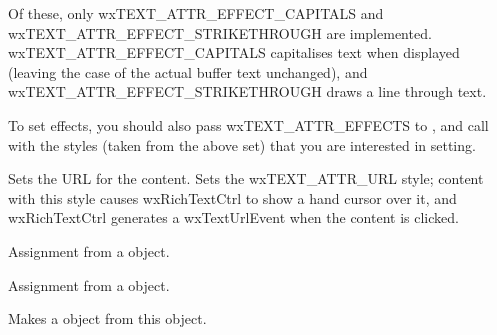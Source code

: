 Of these, only wxTEXT\_ATTR\_EFFECT\_CAPITALS and wxTEXT\_ATTR\_EFFECT\_STRIKETHROUGH are implemented.
wxTEXT\_ATTR\_EFFECT\_CAPITALS capitalises text when displayed (leaving the case of the actual buffer
text unchanged), and wxTEXT\_ATTR\_EFFECT\_STRIKETHROUGH draws a line through text.

To set effects, you should also pass wxTEXT\_ATTR\_EFFECTS to , and call\rtfsp
{} with the styles (taken from the
above set) that you are interested in setting.

\label{wxrichtextattrseturl}


Sets the URL for the content. Sets the wxTEXT\_ATTR\_URL style; content with this style
causes wxRichTextCtrl to show a hand cursor over it, and wxRichTextCtrl generates
a wxTextUrlEvent when the content is clicked.

\label{wxrichtextattroperatorassign}


Assignment from a  object.


Assignment from a  object.

\label{wxrichtextattrwxtextattrex}


Makes a  object from this object.

